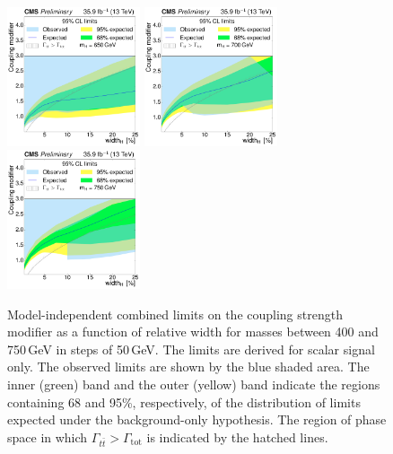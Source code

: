 \begin{figure}[!Hhtb]
\includegraphics[width=0.35\textwidth,keepaspectratio=true]{fig/chapt8/limits/limit_H_M650.pdf}
\includegraphics[width=0.35\textwidth,keepaspectratio=true]{fig/chapt8/limits/limit_H_M700.pdf}
\includegraphics[width=0.35\textwidth,keepaspectratio=true]{fig/chapt8/limits/limit_H_M750.pdf}
\caption{Model-independent combined limits on the coupling strength modifier as a function of relative width for masses between 400 and 750\,GeV in steps of 50\,GeV. The limits are derived for scalar signal only. The observed limits are shown by the blue shaded area. The inner (green) band and the outer (yellow) band indicate the regions containing 68 and 95\%, respectively, of the distribution of limits expected under the background-only hypothesis. The region of phase space in which $\Gamma_{t\bar t}>\Gamma_\mathrm{tot}$ is indicated by the hatched lines.}
\label{fig:limits_h_masses}
\end{figure}

